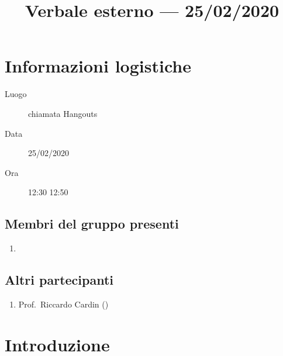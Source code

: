 \documentclass{article}
\title{Verbale esterno --- 25/02/2020}
\begin{document}


\section{Informazioni logistiche}%
\label{sec:informazioni_logistiche}

\begin{description}
  \item [Luogo] chiamata Hangouts
  \item [Data] 25/02/2020
  \item [Ora] 12:30  12:50
\end{description}

\subsection{Membri del gruppo presenti}%
\label{sub:membri_del_gruppo_presenti}

\begin{enumerate}
  \item {}
\end{enumerate}

\subsection{Altri partecipanti}%
\label{sub:altri_partecipanti}

\begin{enumerate}
  \item Prof.\ Riccardo Cardin ()
\end{enumerate}


\section{Introduzione}%
\label{sec:introduzione}
\end{document}
